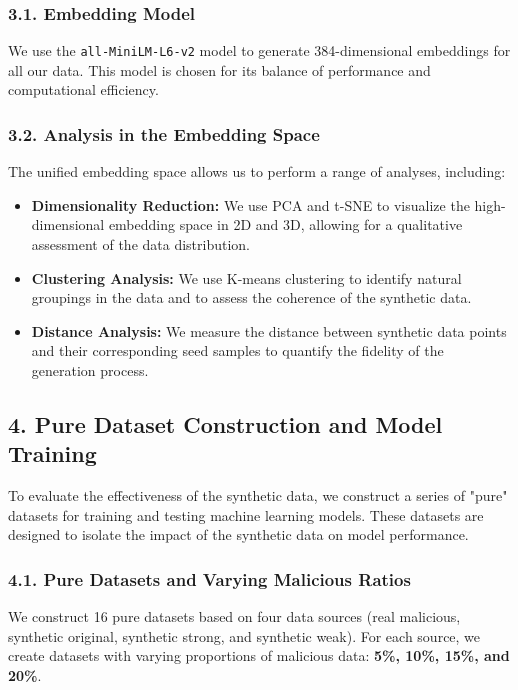 \documentclass{article}
\begin{document}
\subsubsection*{3.1. Embedding Model}

We use the \texttt{all-MiniLM-L6-v2} model to generate 384-dimensional embeddings for all our data. This model is chosen for its balance of performance and computational efficiency.

\subsubsection*{3.2. Analysis in the Embedding Space}

The unified embedding space allows us to perform a range of analyses, including:

\begin{itemize}
    \item \textbf{Dimensionality Reduction:} We use PCA and t-SNE to visualize the high-dimensional embedding space in 2D and 3D, allowing for a qualitative assessment of the data distribution.
    \item \textbf{Clustering Analysis:} We use K-means clustering to identify natural groupings in the data and to assess the coherence of the synthetic data.
    \item \textbf{Distance Analysis:} We measure the distance between synthetic data points and their corresponding seed samples to quantify the fidelity of the generation process.
\end{itemize}

\subsection*{4. Pure Dataset Construction and Model Training}

To evaluate the effectiveness of the synthetic data, we construct a series of "pure" datasets for training and testing machine learning models. These datasets are designed to isolate the impact of the synthetic data on model performance.

\subsubsection*{4.1. Pure Datasets and Varying Malicious Ratios}

We construct 16 pure datasets based on four data sources (real malicious, synthetic original, synthetic strong, and synthetic weak). For each source, we create datasets with varying proportions of malicious data: \textbf{5\%, 10\%, 15\%, and 20\%}.
\end{document}
